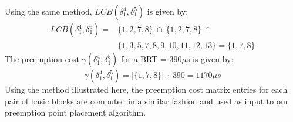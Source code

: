 \noindent
Using the same method, $LCB(\delta_{1}^{4},\delta_{1}^{5})$ is given by:
\begin{equation*}\label{eqn:lcb-example-2}
\begin{split}
    LCB(\delta_{1}^{4},\delta_{1}^{5}) = &\{1,2,7,8\}\ \cap\ \{1,2,7,8\}\ \cap\ \\&\{1,3,5,7,8,9,10,11,12,13\} = \{1,7,8\}
\end{split}
\end{equation*}
\noindent
The preemption cost $\gamma(\delta_{1}^{4},\delta_{1}^{5})$ for a BRT = $390\mu$s is given by:
\begin{equation*}\label{eqn:gamma-example-1}
    \gamma(\delta_{1}^{4},\delta_{1}^{5}) = |\{1,7,8\}|\ \cdot\ 390 = 1170\mu\textit{s}
\end{equation*}
\noindent
Using the method illustrated here, the preemption cost matrix entries for each pair of basic blocks are computed in a similar fashion and used as input to our preemption point placement algorithm.
%
%
%
%

